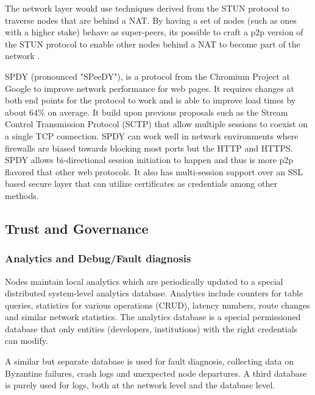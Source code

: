 The network layer would use techniques derived from the STUN protocol to traverse nodes
that are behind a NAT. By having a set of nodes (such as ones with a higher stake) behave as
super-peers, its possible to craft a p2p version of the STUN protocol to enable
other nodes behind a NAT to become part of the network \cite{p2p_nat}.

SPDY (pronounced "SPeeDY"), is a protocol from the Chromium Project at Google \cite{speedy_protocol} to improve network performance for web
pages. It requires changes at both end points for the protocol to work and is able to improve load times by about 64\%
on average. It build upon previous proposals such as the Stream Control Transmission Protocol (SCTP) \cite{sctp}
\cite{sctp_rfc} that allow multiple sessions to coexist on a single TCP connection. SPDY can work well in network
environments where firewalls are biased towards blocking most ports but the HTTP and HTTPS. SPDY allows bi-directional
session initiation to happen and thus is more p2p flavored that other web protocols. It also has multi-session support
over an SSL based secure layer that can utilize certificates as credentials among other methods.


\subsection{Trust and Governance}
\label{net:analytics}

\subsubsection{Analytics and Debug/Fault diagnosis}
Nodes maintain local analytics which are periodically updated to a special distributed system-level analytics
database. Analytics include counters for table queries, statistics for various operations (CRUD), latency numbers, route
changes and similar network statistics. The analytics database is a special permissioned database that only entities
(developers, institutions) with the right credentials can modify.

A similar but separate database is used for fault diagnosis, collecting data on Byzantine failures, crash logs and
unexpected node departures. A third database is purely used for logs, both at the network level and the database level.

